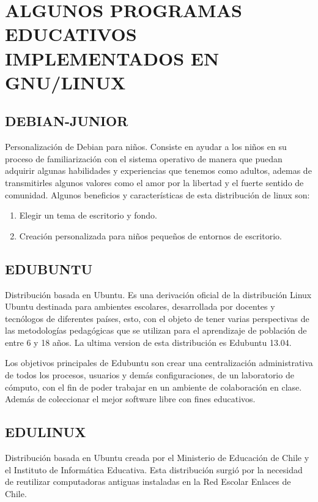 \section*{ALGUNOS PROGRAMAS EDUCATIVOS IMPLEMENTADOS EN GNU/LINUX}
\subsection*{DEBIAN-JUNIOR}
Personalización de Debian para niños.
Consiste en ayudar a los niños en su proceso de familiarización
con el sistema operativo de manera que puedan adquirir algunas
habilidades y experiencias que tenemos como adultos, ademas
de transmitirles algunos valores como el amor por la libertad y
el fuerte sentido de comunidad.
Algunos beneficios y características de esta distribución de linux
son:
\begin{enumerate}
	\item Elegir un tema de escritorio y fondo.
	\item Creación personalizada para niños pequeños de entornos de
			escritorio.
\end{enumerate}

\subsection*{EDUBUNTU}
Distribución basada en Ubuntu.
Es una derivación oficial de la distribución Linux Ubuntu
destinada para ambientes escolares, desarrollada por docentes y
tecnólogos de diferentes países, esto, con el objeto de tener
varias perspectivas de las metodologías pedagógicas que se
utilizan para el aprendizaje de población de entre 6 y 18 años.
La ultima version de esta distribución es Edubuntu 13.04.

Los objetivos principales de Edubuntu son crear una
centralización administrativa de todos los procesos, usuarios y
demás configuraciones, de un laboratorio de cómputo, con el fin
de poder trabajar en un ambiente de colaboración en clase.
Además de coleccionar el mejor software libre con fines
educativos.

\subsection*{EDULINUX}
Distribución basada en Ubuntu creada por el
Ministerio de Educación de Chile y el Instituto de Informática
Educativa.
Esta distribución surgió por la necesidad de reutilizar
computadoras antiguas instaladas en la Red Escolar Enlaces de
Chile.

